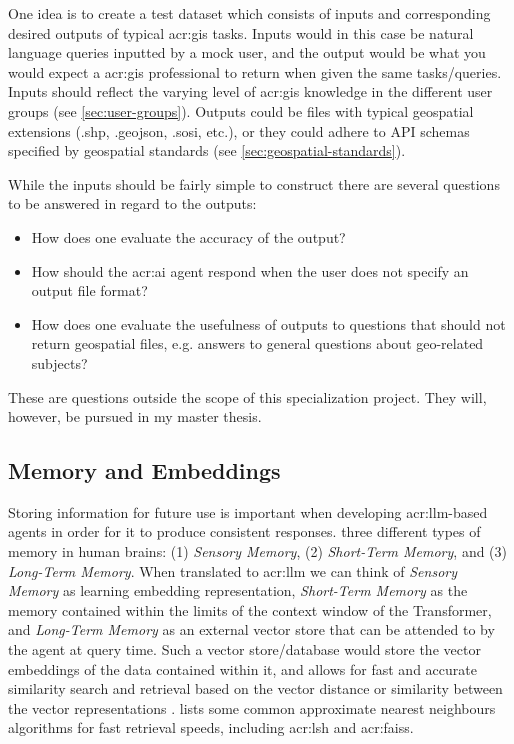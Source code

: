 One idea is to create a test dataset which consists of inputs and corresponding desired outputs of typical \acrshort{acr:gis} tasks. Inputs would in this case be natural language queries inputted by a mock user, and the output would be what you would expect a \acrshort{acr:gis} professional to return when given the same tasks/queries. Inputs should reflect the varying level of \acrshort{acr:gis} knowledge in the different user groups (see \autoref{sec:user-groups}). Outputs could be files with typical geospatial extensions (.shp, .geojson, .sosi, etc.), or they could adhere to API schemas specified by geospatial standards (see \autoref{sec:geospatial-standards}).

While the inputs should be fairly simple to construct there are several questions to be answered in regard to the outputs:

\begin{itemize}
    \item How does one evaluate the accuracy of the output?
    \item How should the \acrshort{acr:ai} agent respond when the user does not specify an output file format?
    \item How does one evaluate the usefulness of outputs to questions that should not return geospatial files, e.g. answers to general questions about geo-related subjects?
\end{itemize}

These are questions outside the scope of this specialization project. They will, however, be pursued in my master thesis.

\subsection{Memory and Embeddings}

Storing information for future use is important when developing \acrshort{acr:llm}-based agents in order for it to produce consistent responses. \cite{wengLLMPoweredAutonomous2023} three different types of memory in human brains: (1) \textit{Sensory Memory}, (2) \textit{Short-Term Memory}, and (3) \textit{Long-Term Memory}. When translated to \acrshort{acr:llm} we can think of \textit{Sensory Memory} as learning embedding representation, \textit{Short-Term Memory} as the memory contained within the limits of the context window of the Transformer, and  \textit{Long-Term Memory} as an external vector store that can be attended to by the agent at query time. Such a vector store/database would store the vector embeddings of the data contained within it, and allows for fast and accurate similarity search and retrieval based on the vector distance or similarity between the vector representations \citep{evchakiVectorDatabase2023}. \cite{wengLLMPoweredAutonomous2023} lists some common approximate nearest neighbours algorithms for fast retrieval speeds, including \gls{acr:lsh} and \gls{acr:faiss}.

